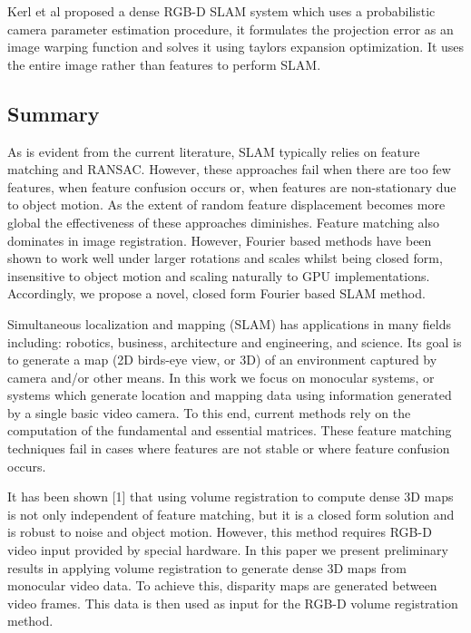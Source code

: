 Kerl et al \cite{Kerl13Dense} proposed a dense RGB-D SLAM system which uses a probabilistic camera parameter estimation procedure, it formulates the projection error as an image warping function and solves it using taylors expansion optimization. It uses the entire image rather than features to perform SLAM.


\subsection{Summary}
As is evident from the current literature, SLAM typically relies on feature matching and RANSAC. However, these approaches fail when there are too few features, when feature confusion occurs or, when features are non-stationary due to object motion. As the extent of random feature displacement becomes more global the effectiveness of these approaches diminishes. Feature matching also dominates in image registration. However, Fourier based methods have been shown to work well under larger rotations and scales \cite{Gonzalez11Improving} whilst being closed form, insensitive to object motion and scaling naturally to GPU implementations. Accordingly, we propose a novel, closed form Fourier based SLAM method.

Simultaneous localization and mapping (SLAM) has applications in many fields including: robotics, business, architecture and engineering, and science. Its goal is to generate a map (2D birds-eye view, or 3D) of an environment captured by camera and/or other means. In this work we focus on monocular systems, or systems which generate location and mapping data using information generated by a single basic video camera. To this end, current methods rely on the computation of the fundamental and essential matrices. These feature matching techniques fail in cases where features are not stable or where feature confusion occurs. 

It has been shown [1] that using volume registration to compute dense 3D maps is not only independent of feature matching, but it is a closed form solution and is robust to noise and object motion. However, this method requires RGB-D video input provided by special hardware. In this paper we present preliminary results in applying volume registration to generate dense 3D maps from monocular video data. To achieve this, disparity maps are generated between video frames. This data is then used as input for the RGB-D volume registration method.
